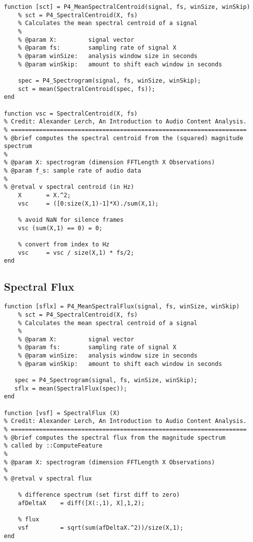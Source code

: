\begin{lstlisting}[caption=Matlab implementation of the spectral centroid., label=snippet-specflux] 
function [sct] = P4_MeanSpectralCentroid(signal, fs, winSize, winSkip)
    % sct = P4_SpectralCentroid(X, fs)
    % Calculates the mean spectral centroid of a signal
    %
    % @param X:         signal vector
    % @param fs:        sampling rate of signal X
    % @param winSize:   analysis window size in seconds
    % @param winSkip:   amount to shift each window in seconds
    
    spec = P4_Spectrogram(signal, fs, winSize, winSkip);
    sct = mean(SpectralCentroid(spec, fs));
end

function vsc = SpectralCentroid(X, fs)
% Credit: Alexander Lerch, An Introduction to Audio Content Analysis.
% ===================================================================
% @brief computes the spectral centroid from the (squared) magnitude spectrum
%
% @param X: spectrogram (dimension FFTLength X Observations)
% @param f_s: sample rate of audio data 
%
% @retval v spectral centroid (in Hz)
    X       = X.^2;
    vsc     = ([0:size(X,1)-1]*X)./sum(X,1);
 
    % avoid NaN for silence frames
    vsc (sum(X,1) == 0) = 0;
 
    % convert from index to Hz
    vsc     = vsc / size(X,1) * fs/2;
end
\end{lstlisting}

\subsection{Spectral Flux}
\label{app:feat-flux}

\begin{lstlisting}[caption=Matlab implementation of the spectral flux., label=snippet-specflux]
function [sflx] = P4_MeanSpectralFlux(signal, fs, winSize, winSkip)
    % sct = P4_SpectralCentroid(X, fs)
    % Calculates the mean spectral centroid of a signal
    %
    % @param X:         signal vector
    % @param fs:        sampling rate of signal X
    % @param winSize:   analysis window size in seconds
    % @param winSkip:   amount to shift each window in seconds
    
   spec = P4_Spectrogram(signal, fs, winSize, winSkip);
   sflx = mean(SpectralFlux(spec));
end

function [vsf] = SpectralFlux (X)
% Credit: Alexander Lerch, An Introduction to Audio Content Analysis.
% ===================================================================
% @brief computes the spectral flux from the magnitude spectrum
% called by ::ComputeFeature
%
% @param X: spectrogram (dimension FFTLength X Observations)
%
% @retval v spectral flux

    % difference spectrum (set first diff to zero)
    afDeltaX    = diff([X(:,1), X],1,2);
 
    % flux
    vsf         = sqrt(sum(afDeltaX.^2))/size(X,1);
end
\end{lstlisting}

